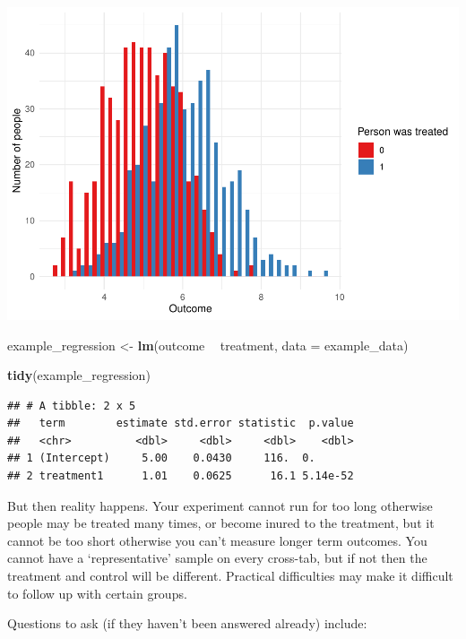 \documentclass[
]{book}
\newenvironment{Shaded}{\begin{snugshade}}{\end{snugshade}}
\newcommand{\DataTypeTok}[1]{\textcolor[rgb]{0.13,0.29,0.53}{#1}}
\newcommand{\KeywordTok}[1]{\textcolor[rgb]{0.13,0.29,0.53}{\textbf{#1}}}
\newcommand{\NormalTok}[1]{#1}
\newcommand{\OperatorTok}[1]{\textcolor[rgb]{0.81,0.36,0.00}{\textbf{#1}}}
\newcommand{\StringTok}[1]{\textcolor[rgb]{0.31,0.60,0.02}{#1}}
\begin{document}
\includegraphics{telling_stories_with_data_files/figure-latex/unnamed-chunk-238-1.pdf}

\begin{Shaded}
\begin{Highlighting}[]
\NormalTok{example_regression <-}\StringTok{ }\KeywordTok{lm}\NormalTok{(outcome }\OperatorTok{~}\StringTok{ }\NormalTok{treatment, }\DataTypeTok{data =}\NormalTok{ example_data)}

\KeywordTok{tidy}\NormalTok{(example_regression)}
\end{Highlighting}
\end{Shaded}

\begin{verbatim}
## # A tibble: 2 x 5
##   term        estimate std.error statistic  p.value
##   <chr>          <dbl>     <dbl>     <dbl>    <dbl>
## 1 (Intercept)     5.00    0.0430     116.  0.      
## 2 treatment1      1.01    0.0625      16.1 5.14e-52
\end{verbatim}

But then reality happens. Your experiment cannot run for too long otherwise people may be treated many times, or become inured to the treatment, but it cannot be too short otherwise you can't measure longer term outcomes. You cannot have a `representative' sample on every cross-tab, but if not then the treatment and control will be different. Practical difficulties may make it difficult to follow up with certain groups.

Questions to ask (if they haven't been answered already) include:
\end{document}
